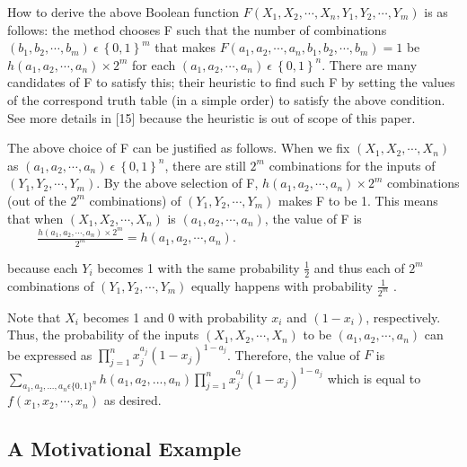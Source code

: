 \documentclass[10pt,conference]{IEEEtran}
\begin{document}
\par
How to derive the above Boolean function
$F(X_1, X_2, \cdots , X_n, Y_1, Y_2, \cdots , Y_m)$ is as follows:
the method chooses F such that the number
of combinations $(b_1, b_2, \cdots , b_m)   \:\epsilon\:   \left \{ 0,1 \right \}^m$ that
makes $F(a_1, a_2, \cdots , a_n, b_1, b_2, \cdots , b_m) = 1$ be
$h(a_1, a_2, \cdots , a_n) \times 2^m$ for each $(a_1, a_2, \cdots , a_n) \:\epsilon\:   \left \{ 0,1 \right \}^n$.
There are many candidates of F to satisfy this; their heuristic
to find such F by setting the values of the correspond truth
table (in a simple order) to satisfy the above condition. See
more details in [15] because the heuristic is out of scope of
this paper.

\par
The above choice of F can be justified as follows. When
we fix $(X_1, X_2, \cdots , X_n)$ as $(a_1, a_2, \cdots , a_n) \:\epsilon\:   \left \{ 0,1 \right \}^n$, there are still $2^m$ combinations for the inputs of $(Y_1, Y_2, \cdots , Y_m)$. By the above selection of F, $h(a_1, a_2, \cdots , a_n) \times 2^m$ combinations (out of the $2^m$ combinations) of $(Y_1, Y_2, \cdots , Y_m)$ makes F to be 1. This means that when $(X_1, X_2, \cdots , X_n)$ is $(a_1, a_2, \cdots , a_n)$, the value of F is \\

\begin{math}
\hspace{1cm} \frac{h(a_1, a_2, \cdots , a_n) \times 2^m}{2^m} = h(a_1, a_2, \cdots , a_n).
\end{math}

\noindent
because each $Y_i$ becomes 1 with the same probability $\frac{1}{2}$ and thus each of $2^m$ combinations of ${(Y_1, Y_2, \cdots , Y_m)}$ equally
happens with probability $\frac{1}{2^m}$ .

\par
Note that $X_i$ becomes 1 and 0 with probability $x_i$ and
$(1 - x_i)$, respectively. Thus, the probability of the inputs
$(X_1, X_2, \cdots , X_n)$ to be $(a_1, a_2, \cdots , a_n)$ can be expressed as $\prod_{j=1}^{n}x_j^{a_j}(1-x_j)^{1-a_j}$.  Therefore, the value of $F$ is $\sum_{a_1, a_2,...,a_n\epsilon \{{0,1}\}^{n}}h(a_1, a_2,...,a_n)\prod_{j=1}^{n}x_j^{a_j}(1-x_j)^{1-a_j}$ which is equal to $f(x_1, x_2,\cdots, x_n)$ as desired.

\subsection{A Motivational Example}
\end{document}

